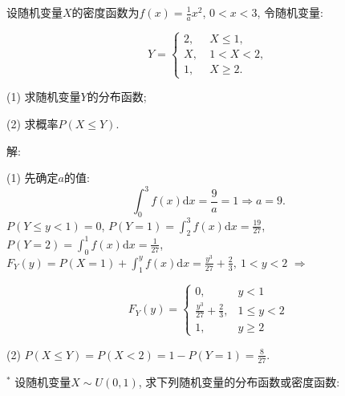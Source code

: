 \documentclass[standard]{ExBook}
\begin{document}
\begin{qitems}
\vspace{-5em}

    \begin{bbox}
    \begin{shaded}
        \qitem
设随机变量$X$的密度函数为$f(x)=\frac{1}{a}x^2$, $0 < x < 3$, 令随机变量:
\vspace{-2em}
\begin{center}
\begin{equation}
    Y=
    \left\{
    \begin{array}{cl}
        \nonumber
        2,\ &X \leq 1,\\
        X,\ &1 < X < 2,\\
        1,\ &X \geq 2.
    \end{array}
    \right.
\end{equation}
\end{center}
(1) 求随机变量$Y$的分布函数;

(2) 求概率$P(X\leq Y)$.
    \end{shaded}
    \end{bbox}

\vspace{-5em}

    \begin{bbox}
解: 

(1) 先确定$a$的值:
$$\displaystyle\int_{0}^{3}f(x)\mathrm{d}x=\frac{9}{a}=1 \Longrightarrow a=9.$$
$P(Y\leq y<1)=0$, $P(Y=1)=\displaystyle\int_{2}^{3}f(x)\mathrm{d}x=\frac{19}{27}$, $P(Y=2)=\displaystyle\int_{0}^{1}f(x)\mathrm{d}x=\frac{1}{27}$, $F_{Y}(y)=P(X=1)+\displaystyle\int_{1}^{y}f(x)\mathrm{d}x=\frac{y^3}{27}+\frac{2}{3},\ 1<y<2$ $\Longrightarrow$
\vspace{-2em}
\begin{center}
\begin{equation}
    F_{Y}(y)=
    \left\{
    \begin{array}{cl}
        \nonumber
        0, &y<1\\
        \frac{y^3}{27}+\frac{2}{3}, &1\leq y<2\\
        1, &y\geq 2
    \end{array}
    \right.
\end{equation}
\end{center}
(2) $P(X\leq Y)=P(X<2)=1-P(Y=1)=\displaystyle\frac{8}{27}$.
    \end{bbox}

\vspace{-5em}

    \begin{bbox}
    \begin{shaded}
        \qitem$^{*}$
设随机变量$X\sim U(0,1)$, 求下列随机变量的分布函数或密度函数:


\end{shaded}
\end{bbox}
\end{qitems}
\end{document}

